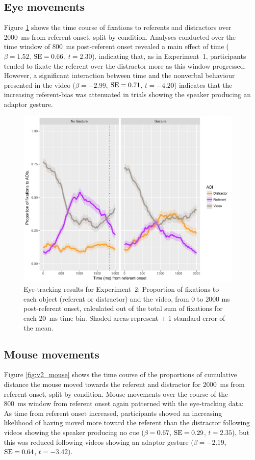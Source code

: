 \documentclass[a4paper,man,natbib]{apa6}
\newcommand{\resultsLM}[3]{$\beta = #1$, $\textnormal{SE} = #2$, $t #3$}
\begin{document}
\subsection{Eye movements}
Figure \ref{fig:v2_eye} shows the time course of fixations to referents and distractors over 2000~ms from referent onset, split by condition.
Analyses conducted over the time window of 800~ms post-referent onset revealed a main effect of time (\resultsLM{1.52}{0.66}{=2.30}), indicating that, as in Experiment~1, participants tended to fixate the referent over the distractor more as this window progressed.
However, a significant interaction between time and the nonverbal behaviour presented in the video (\resultsLM{-2.99}{0.71}{=-4.20}) indicates that the increasing referent-bias was attenuated in trials showing the speaker producing an adaptor gesture. 

\begin{figure}[Ht]
  \centering
	\includegraphics[width=\linewidth]{./img/e8_fixations.pdf}
  \caption{Eye-tracking results for Experiment~2: Proportion of fixations to each object (referent or distractor) and the video, from 0 to 2000 ms post-referent onset, calculated out of the total sum of fixations for each 20~ms time bin. Shaded areas represent $\pm$ 1 standard error of the mean.}
  \label{fig:v2_eye}
\end{figure}

\subsection{Mouse movements}
Figure \ref{fig:v2_mouse} shows the time course of the proportions of cumulative distance the mouse moved towards the referent and distractor for 2000~ms from referent onset, split by condition.
Mouse-movements over the course of the 800~ms window from referent onset again patterned with the eye-tracking data:
As time from referent onset increased, participants showed an increasing likelihood of having moved more toward the referent than the distractor following videos showing the speaker producing no cue (\resultsLM{0.67}{0.29}{=2.35}), but this was reduced following videos showing an adaptor gesture (\resultsLM{-2.19}{0.64}{=-3.42}).
\end{document}
